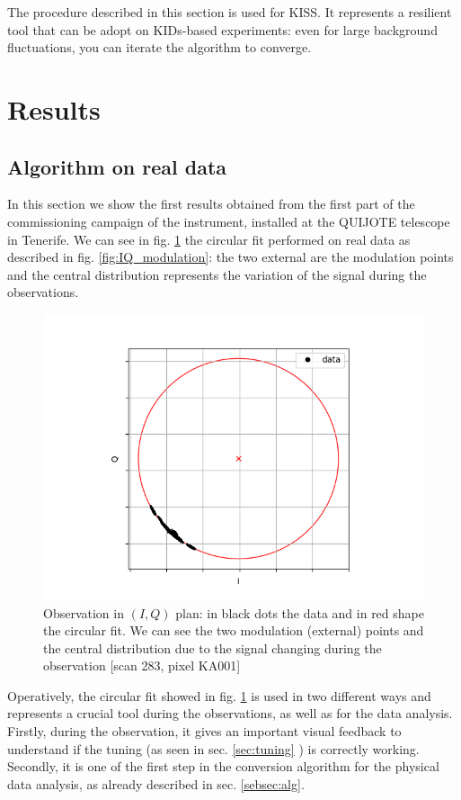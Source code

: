 \documentclass[twocolumn,traditabstract]{aa}\\
\begin{document}
The procedure described in this section is used for KISS. It represents a resilient tool that can be adopt on KIDs-based experiments: even for large background fluctuations, you can iterate the algorithm to converge.


\section{Results}
\label{sec:results}

\subsection{Algorithm on real data}

In this section we show the first results obtained from the first part of the commissioning campaign of the instrument, installed at the QUIJOTE telescope in Tenerife. We can see in fig. \ref{fig:circle} the circular fit performed on real data as described in fig. \ref{fig:IQ_modulation}: the two external are the modulation points and the central distribution represents the variation of the signal during the observations.


\begin{figure}[htf]
	\centering
	\includegraphics[width=.5\textwidth]{4.results/circular_fit.png}
	\caption{Observation in $(I,Q)$ plan: in black dots the data and in red shape the circular fit. We can see the two modulation (external) points and the central distribution due to the signal changing during the observation [scan 283, pixel KA001]}
	\label{fig:circle}
\end{figure}

\noindent Operatively, the circular fit showed in fig. \ref{fig:circle} is used in two different ways and represents a crucial tool during the observations, as well as for the data analysis. Firstly, during the observation, it gives an important visual feedback to understand if the tuning (as seen in sec. \ref{sec:tuning} ) is correctly working. Secondly, it is one of the first step in the conversion algorithm for the physical data analysis, as already described in sec. \ref{sebsec:alg}.
\end{document}
